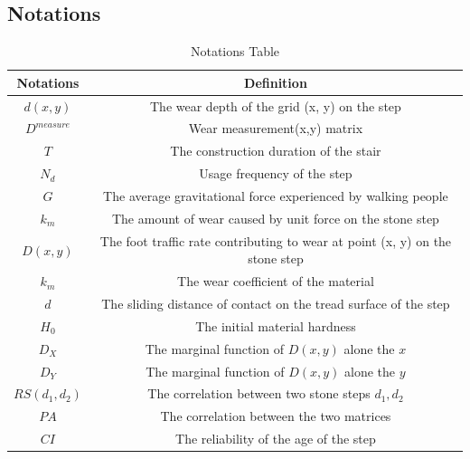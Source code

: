 \documentclass[12pt]{article}  %
\numberwithin{equation}{section} %
\begin{document}
\begin{itemize}
\end{itemize}

\vspace{-1.0em}
\subsection{Notations}
\begin{table}[H]
\vspace{-2.0em}
	\centering
        \caption{Notations Table}
        \renewcommand{\arraystretch}{1.5}
        \setlength{\tabcolsep}{16pt}
	\begin{tabular}{cc}
		\hline
		\hline
		\multicolumn{1}{c}{\textbf{Notations}} & \textbf{Definition}\\ \hline
        $d(x,y)$                       & The wear depth of the grid (x, y) on the step\\
        $D^{measure}$         & Wear measurement(x,y)
matrix\\
		$T$                      & The construction duration of the stair
\\
		$N_d$                      & Usage frequency of the step\\
		$G$                       & The average gravitational force experienced by walking people\\
        $k_m$                       & The amount of wear caused by unit force on the stone step\\
        $D(x,y)$                       & The foot traffic rate contributing to wear at point (x, y) on the stone step\\
        $k_m$                       & The wear coefficient of the material\\
        $d$                       & The sliding distance of contact on the tread surface of the step\\
        $H_0$                       & The initial material hardness\\
        $D_X$                       & The marginal function of $D(x,y)$ alone the $x$\\
        $D_Y$                       & The marginal function of $D(x,y)$ alone the $y$\\
        $RS(d_1, d_2)$                       & The correlation between two stone steps $d_1,d_2$\\
        $PA$                    &  The correlation between the two matrices\\
        $CI$                    &  The reliability of the age of the step\\
        
    \hline
		\hline
	\end{tabular}
\end{table}
\end{document}
